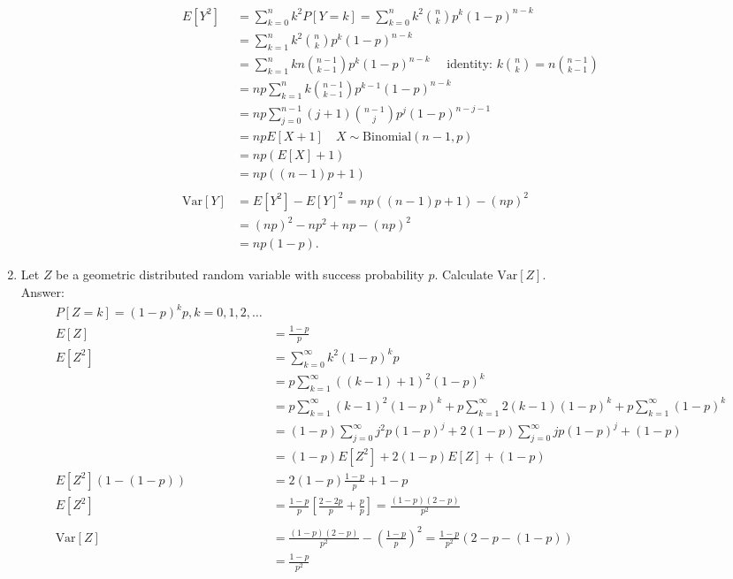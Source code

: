 \documentclass{article}
\begin{document}
\begin{enumerate}
\begin{align*}
E[Y^2] &= \sum_{k=0}^n k^2 P[Y = k] = \sum_{k=0}^n k^2 \binom{n}{k} p^k(1-p)^{n-k} \\
&= \sum_{k=1}^n k^2 \binom{n}{k} p^k(1-p)^{n-k} \\
&= \sum_{k=1}^n kn \binom{n-1}{k-1} p^k(1-p)^{n-k} \quad \text{ identity: }k\binom{n}{k} = n\binom{n-1}{k-1} \\
&= np \sum_{k=1}^n k \binom{n-1}{k-1}p^{k-1}(1-p)^{n-k} \\
&= np \sum_{j=0}^{n-1} (j+1)\binom{n-1}{j} p^j(1-p)^{n-j-1} \\
&= npE[X+1] \quad X \sim \text{Binomial}(n-1,p) \\
&= np(E[X]+ 1) \\
&= np((n-1)p + 1) \\
&\\
\text{Var}[Y] &= E[Y^2] - E[Y]^2 = np((n-1)p + 1) - (np)^2 \\
&= (np)^2 - np^2 + np - (np)^2 \\
&= np(1-p).
\end{align*}



\newpage
\item

Let $Z$ be a geometric distributed random variable with success probability $p$. Calculate $\text{Var}[Z]$. \\

Answer: 
\begin{align*}
P[Z = k] = (1-p)^kp, k = 0,1,2,\dots \\
E[Z] &= \frac{1-p}{p} \\
E[Z^2] &= \sum_{k=0}^\infty k^2(1-p)^kp \\
&= p \sum_{k=1}^\infty ((k-1) + 1)^2(1-p)^k \\
&= p \sum_{k=1}^\infty (k-1)^2(1-p)^k + p\sum_{k=1}^\infty 2(k-1)(1-p)^k + p \sum_{k=1}^\infty (1-p)^k \\
&= (1-p)\sum_{j=0}^\infty j^2p(1-p)^j + 2(1-p)\sum_{j=0}^\infty jp(1-p)^j + (1-p) \\
&= (1-p)E[Z^2] + 2(1-p)E[Z] + (1-p) \\
E[Z^2](1 - (1-p)) &= 2(1-p)\frac{1-p}{p} + 1-p \\
E[Z^2] &= \frac{1-p}{p}\left[\frac{2-2p}{p} + \frac{p}{p}\right] = \frac{(1-p)(2-p)}{p^2} \\
&\\
\text{Var}[Z] &= \frac{(1-p)(2-p)}{p^2} - \left(\frac{1-p}{p}\right)^2  = \frac{1-p}{p^2}(2-p-(1-p))\\
&= \boxed{\frac{1-p}{p^2}}
\end{align*}


\end{enumerate}
\end{document}
